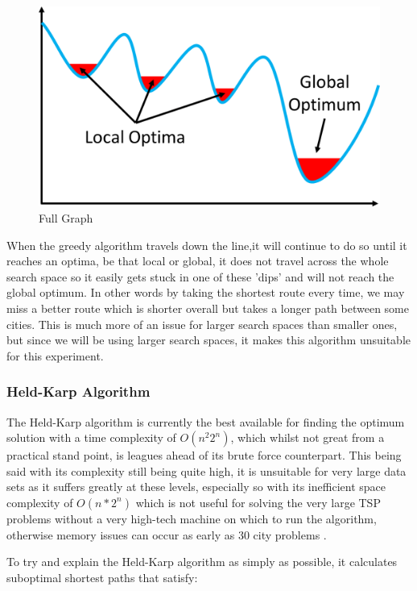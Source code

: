 \documentclass[11pt,a4paper,titlepage]{article}
\begin{document}
\begin{figure}[ht]
	\includegraphics[scale=0.3]{LocalGlobalOptima}
	\centering
	\caption{Full Graph}
\end{figure}

When the greedy algorithm travels down the line,it will continue to do so until it reaches an optima, be that local or global, it does not travel across the whole search space so it easily gets stuck in one of these 'dips' and will not reach the global optimum. In other words by taking the shortest route every time, we may miss a better route which is shorter overall but takes a longer path between some cities. This is much more of an issue for larger search spaces than smaller ones, but since we will be using larger search spaces, it makes this algorithm unsuitable for this experiment.

\subsubsection{Held-Karp Algorithm}
The Held-Karp algorithm is currently the best available for finding the optimum solution with a time complexity of $O(n^2 2^n)$, which whilst not great from a practical stand point, is leagues ahead of its brute force counterpart. This being said with its complexity still being quite high, it is unsuitable for very large data sets as it suffers greatly at these levels, especially so with its inefficient space complexity of $O(n*2^n)$ which is not useful for solving the very large TSP problems without a very high-tech machine on which to run the algorithm, otherwise memory issues can occur as early as 30 city problems \cite{HeldKarpAlg}.

To try and explain the Held-Karp algorithm as simply as possible, it calculates suboptimal shortest paths that satisfy:
\end{document}
